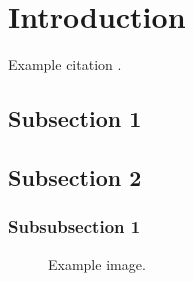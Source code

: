 \documentclass[12pt]{article} %
\begin{document}

\tableofcontents %

\newpage %


\section{Introduction} %

Example citation \cite{Figueredo:2009dg}.


\subsection{Subsection 1} %

\lipsum[1] %


\subsection{Subsection 2} %

\lipsum[2] %


\subsubsection{Subsubsection 1} %

\lipsum[3] %

\begin{figure}[H] %
  \caption{Example image.}
  \label{fig:speciation}
\end{figure}
\end{document}
